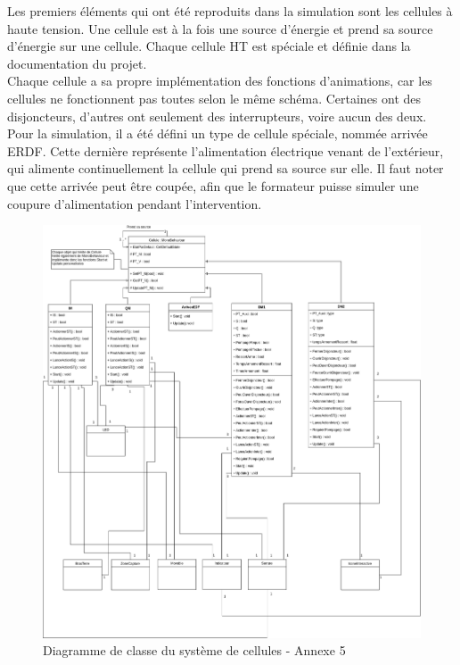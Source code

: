 \documentclass[a4paper]{article}
\begin{document}
    Les premiers éléments qui ont été reproduits dans la simulation sont les cellules à haute tension. Une cellule est à la fois une source d'énergie et prend sa source d'énergie sur une cellule. Chaque cellule HT est spéciale et définie dans la documentation du projet. \\

    Chaque cellule a sa propre implémentation des fonctions d'animations, car les cellules ne fonctionnent pas toutes selon le même schéma. Certaines ont des disjoncteurs, d'autres ont seulement des interrupteurs, voire aucun des deux. \\

    Pour la simulation, il a été défini un type de cellule spéciale, nommée arrivée ERDF. Cette dernière représente l'alimentation électrique venant de l'extérieur, qui alimente continuellement la cellule qui prend sa source sur elle. Il faut noter que cette arrivée peut être coupée, afin que le formateur puisse simuler une coupure d'alimentation pendant l'intervention. \\

    \begin{figure}[H]
        \centering
        \includegraphics[scale=0.2]{img/DiagClassCellules}
        \caption{Diagramme de classe du système de cellules - Annexe 5}
    \end{figure}
\end{document}
